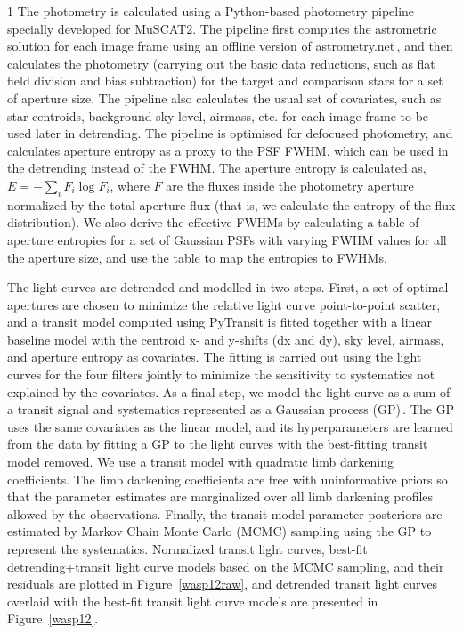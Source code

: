 \documentclass[a4paper,12pt]{spieman}  %
\begin{document}
\begin{spacing}{1}
The photometry is calculated using a Python-based photometry pipeline
specially developed for MuSCAT2.
The pipeline first computes the astrometric solution for each image frame
using an offline version of astrometry.net\cite{2010AJ....139.1782L}\,\!, and then calculates the photometry
(carrying out the basic data reductions, such as flat field division and bias subtraction)
for the target and comparison stars for a set of aperture size.
The pipeline also calculates the usual set of covariates, such as star centroids,
background sky level, airmass, etc. for each image frame to be used later in detrending.
The pipeline is optimised for defocused photometry, and calculates aperture entropy
as a proxy to the PSF FWHM, which can be used in the detrending instead of the FWHM.
The aperture entropy is calculated as,
$E = - \sum_i F_i \log F_i$,
where $F$ are the fluxes inside the photometry aperture normalized by the
total aperture flux (that is, we calculate the entropy of the flux distribution).
We also derive the effective FWHMs by calculating a table of
aperture entropies for a set of Gaussian PSFs with varying FWHM values
for all the aperture size, and use the table to map the entropies to FWHMs.

The light curves are detrended and modelled in two steps.
First, a set of optimal apertures are chosen to minimize the relative light curve point-to-point scatter,
and a transit model computed using PyTransit\cite{2015MNRAS.450.3233P}
is fitted together with a linear baseline model
with the centroid x- and y-shifts (dx and dy), sky level, airmass, and aperture entropy as covariates.
The fitting is carried out using the light curves for the four filters jointly to minimize
the sensitivity to systematics not explained by the covariates.
As a final step, we model the light curve as a sum of a transit signal and systematics represented
as a Gaussian process (GP)\cite{Rasmussen2006,2012MNRAS.419.2683G,2015ITPAM..38..252A}\,\!.
The GP uses the same covariates as the linear model,
and its hyperparameters are learned from the data by fitting a GP to the light curves
with the best-fitting transit model removed.
We use a transit model with quadratic limb darkening coefficients.
The limb darkening coefficients are free with uninformative priors so that the parameter estimates
are marginalized over all limb darkening profiles allowed by the observations.
Finally, the transit model parameter posteriors are estimated by Markov Chain Monte Carlo (MCMC)
sampling using the GP to represent the systematics.
Normalized transit light curves, best-fit detrending+transit light curve models based on the MCMC sampling,
and their residuals are plotted in Figure~\ref{wasp12raw}, and detrended transit light curves overlaid with
the best-fit transit light curve models are presented in Figure~\ref{wasp12}.


\end{spacing}
\end{document}
